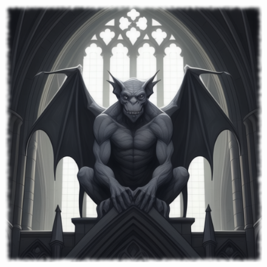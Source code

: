
\begin{figure}[h]
\begin{center}
\includegraphics[scale=0.24]{img/ai-images/gargoyle.png}
\end{center}
\end{figure}
